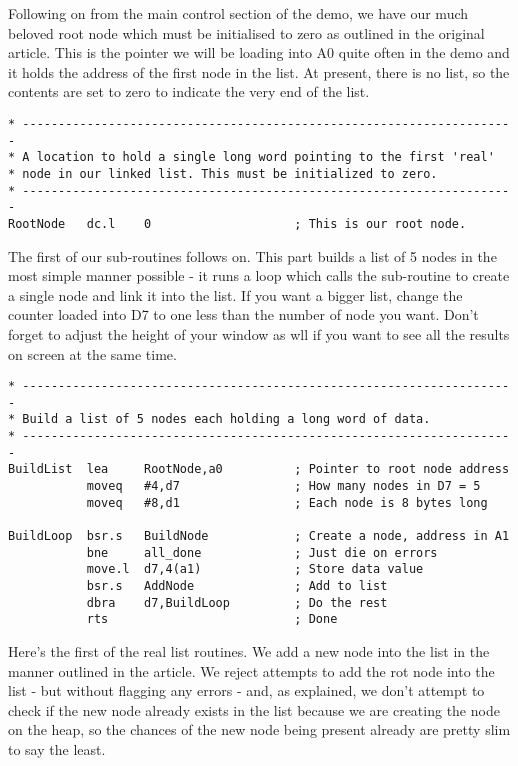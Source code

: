 Following on from the main control section of the demo, we have our
    much beloved root node which must be initialised to zero as outlined in
    the original article. This is the pointer we will be loading into A0 quite
    often in the demo and it holds the address of the first node in the list.
    At present, there is no list, so the contents are set to zero to indicate
    the very end of the list.

\begin{lstlisting}[firstnumber=last,caption={Single Linked List - Demo Code - Root Node}]
* ---------------------------------------------------------------------
* A location to hold a single long word pointing to the first 'real'
* node in our linked list. This must be initialized to zero.
* ---------------------------------------------------------------------
RootNode   dc.l    0                    ; This is our root node.
\end{lstlisting}

The first of our sub-{}routines follows on. This part builds a list of
    5 nodes in the most simple manner possible -{} it runs a loop which calls
    the sub-{}routine to create a single node and link it into the list. If you
    want a bigger list, change the counter loaded into D7 to one less than the
    number of node you want. Don't forget to adjust the height of your window
    as wll if you want to see all the results on screen at the same
    time.

\begin{lstlisting}[firstnumber=last,caption={Single Linked List - Demo Code - Build List}]
* ---------------------------------------------------------------------
* Build a list of 5 nodes each holding a long word of data.
* ---------------------------------------------------------------------
BuildList  lea     RootNode,a0          ; Pointer to root node address
           moveq   #4,d7                ; How many nodes in D7 = 5
           moveq   #8,d1                ; Each node is 8 bytes long

BuildLoop  bsr.s   BuildNode            ; Create a node, address in A1
           bne     all_done             ; Just die on errors
           move.l  d7,4(a1)             ; Store data value
           bsr.s   AddNode              ; Add to list
           dbra    d7,BuildLoop         ; Do the rest
           rts                          ; Done
\end{lstlisting}

Here's the first of the real list routines. We add a new node into
    the list in the manner outlined in the article. We reject attempts to add
    the rot node into the list -{} but without flagging any errors -{} and, as
    explained, we don't attempt to check if the new node already exists in the
    list because we are creating the node on the heap, so the chances of the
    new node being present already are pretty slim to say the least.

